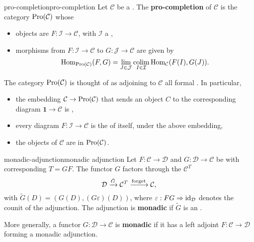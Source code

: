 \begin{topic}{pro-completion}{pro-completion}
    Let $\mathcal{C}$ be a . The \textbf{pro-completion} of $\mathcal{C}$ is the category $\textup{Pro}(\mathcal{C})$ whose
    \begin{itemize}
        \item objects are  $F \colon \mathcal{I} \to \mathcal{C}$, with $\mathcal{I}$ a  ,
        \item morphisms from $F \colon \mathcal{I} \to \mathcal{C}$ to $G \colon \mathcal{J} \to \mathcal{C}$ are given by
        \[ \operatorname{Hom}_{\textup{Pro}(\mathcal{C})}(F, G) = \lim_{J \in \mathcal{J}} \operatorname*{colim}_{I \in \mathcal{I}} \operatorname{Hom}_\mathcal{C}(F(I), G(J)) . \]
    \end{itemize}
    The category $\textup{Pro}(\mathcal{C})$ is thought of as adjoining to $\mathcal{C}$ all formal . In particular,
    \begin{itemize}
        \item the embedding $\mathcal{C} \to \textup{Pro}(\mathcal{C})$ that sends an object $C$ to the corresponding diagram $\textbf{1} \to \mathcal{C}$ is  ,
        \item every diagram $F \colon \mathcal{I} \to \mathcal{C}$ is the  of itself, under the above embedding,
        \item the objects of $\mathcal{C}$ are  in $\textup{Pro}(\mathcal{C})$.
    \end{itemize}
\end{topic}

\begin{topic}{monadic-adjunction}{monadic adjunction}
    Let $F \colon \mathcal{C} \to \mathcal{D}$ and $G \colon \mathcal{D} \to \mathcal{C}$ be  with corresponding  $T = GF$. The functor $G$ factors through the  $\mathcal{C}^T$
    \[ \mathcal{D} \xrightarrow{\tilde{G}} \mathcal{C}^T \xrightarrow{\textup{forget}} \mathcal{C} , \]
    with $\tilde{G}(D) = (G(D), (G \varepsilon) (D))$, where $\varepsilon : FG \Rightarrow \textup{id}_\mathcal{D}$ denotes the counit of the adjunction. The adjunction is \textbf{monadic} if $\tilde{G}$ is an .
    
    More generally, a functor $G \colon \mathcal{D} \to \mathcal{C}$ is \textbf{monadic} if it has a left adjoint $F \colon \mathcal{C} \to \mathcal{D}$ forming a monadic adjunction.
\end{topic}

